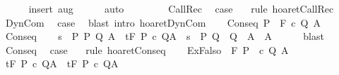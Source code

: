 \begin{isabellebody}
\ \ \ \ \isamarkupfalse%
\ {\isacharparenleft}insert\ aug{\isacharparenright}\isanewline
\ \ \ \ \isamarkupfalse%
\ auto\isanewline
\ \ \ \ \isamarkupfalse%
\isanewline
\ \ \isamarkupfalse%
\ CallRec\ \isamarkupfalse%
\ {\isacharquery}case\ \isamarkupfalse%
\ {\isacharminus}\ {\isacharparenleft}rule\ hoaret{\isachardot}CallRec{\isacharparenright}\isanewline
{}\isamarkupfalse%
\isanewline
\ \ \isamarkupfalse%
\ DynCom\ \isamarkupfalse%
\ {\isacharquery}case\ \isamarkupfalse%
\ {\isacharparenleft}blast\ intro{\isacharcolon}\ hoaret{\isachardot}DynCom{\isacharparenright}\isanewline
{}\isamarkupfalse%
\isanewline
\ \ \isamarkupfalse%
\ {\isacharparenleft}Conseq\ P\ {\isasymTheta}\ F\ c\ Q\ A\ {\isasymTheta}{\isacharprime}{\isacharparenright}\isanewline
\ \ \isamarkupfalse%
\ Conseq\isanewline
\ \ \isamarkupfalse%
\ {\isachardoublequoteopen}{\isasymforall}s\ {\isasymin}\ P{\isachardot}\ {\isacharparenleft}{\isasymexists}P{\isacharprime}\ Q{\isacharprime}\ A{\isacharprime}{\isachardot}\ {\isacharparenleft}{\isasymGamma}{\isacharcomma}{\isasymTheta}{\isacharprime}\ {\isasymturnstile}\isactrlsub t\isactrlbsub {\isacharslash}F\isactrlesub \ P{\isacharprime}\ c\ Q{\isacharprime}{\isacharcomma}A{\isacharprime}{\isacharparenright}\ {\isasymand}\ s\ {\isasymin}\ P{\isacharprime}{\isasymand}\ Q{\isacharprime}\ {\isasymsubseteq}\ Q\ {\isasymand}\ A{\isacharprime}\ {\isasymsubseteq}\ A{\isacharparenright}{\isachardoublequoteclose}\isanewline
\ \ \ \ \isamarkupfalse%
\ blast\isanewline
\ \ \isamarkupfalse%
\ Conseq\ \isamarkupfalse%
\ {\isacharquery}case\ \isamarkupfalse%
\ {\isacharminus}\ {\isacharparenleft}rule\ hoaret{\isachardot}Conseq{\isacharparenright}\isanewline
{}\isamarkupfalse%
\isanewline
\ \ \isamarkupfalse%
\ {\isacharparenleft}ExFalso\ {\isasymTheta}\ F\ P\ \ c\ Q\ A\ {\isasymTheta}{\isacharprime}{\isacharparenright}\isanewline
\ \ \isamarkupfalse%
\ {\isachardoublequoteopen}{\isasymGamma}{\isacharcomma}{\isasymTheta}{\isasymTurnstile}\isactrlsub t\isactrlbsub {\isacharslash}F\isactrlesub \ P\ c\ Q{\isacharcomma}A{\isachardoublequoteclose}\ {\isachardoublequoteopen}{\isasymnot}\ {\isasymGamma}{\isasymTurnstile}\isactrlsub t\isactrlbsub {\isacharslash}F\isactrlesub \ P\ c\ Q{\isacharcomma}A{\isachardoublequoteclose}\ {\isachardoublequoteopen}{\isasymTheta}\ {\isasymsubseteq}\ {\isasymTheta}{\isacharprime}{\isachardoublequoteclose}\ \ \isamarkupfalse%

\end{isabellebody}
